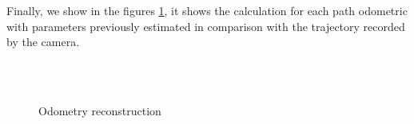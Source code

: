 Finally, we show in the figures \ref{fig:OdoRec}, it shows the calculation for each path odometric with parameters previously estimated in comparison with the trajectory recorded by the camera.
\begin{figure}[!ht]
 \,
 \\
 \,
\caption{Odometry reconstruction}
\label{fig:OdoRec}
\end{figure}